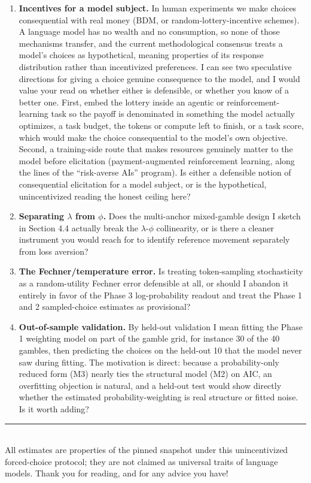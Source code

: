 \documentclass[11pt]{article}
\begin{document}
\begin{enumerate}[leftmargin=1.5em]
\item \textbf{Incentives for a model subject.} In human experiments we make choices consequential with real
money (BDM, or random-lottery-incentive schemes). A language model has no wealth and no
consumption, so none of those mechanisms transfer, and the current methodological consensus treats a model's
choices as hypothetical, meaning properties of its response distribution rather than incentivized preferences.
I can see two speculative directions for giving a choice genuine consequence to the model, and I would value
your read on whether either is defensible, or whether you know of a better one. First, embed the lottery
inside an agentic or reinforcement-learning task so the payoff is denominated in something the model actually
optimizes, a task budget, the tokens or compute left to finish, or a task score, which would make the choice
consequential to the model's own objective. Second, a training-side route that makes resources genuinely
matter to the model before elicitation (payment-augmented reinforcement learning, along the lines of the
``risk-averse AIs'' program). Is either a defensible notion of consequential elicitation for a model subject,
or is the hypothetical, unincentivized reading the honest ceiling here?
\item \textbf{Separating $\lambda$ from $\phi$.} Does the multi-anchor mixed-gamble design I sketch in
Section 4.4 actually break the $\lambda$-$\phi$ collinearity, or is there a cleaner instrument you would reach
for to identify reference movement separately from loss aversion?
\item \textbf{The Fechner/temperature error.} Is treating token-sampling stochasticity as a random-utility
Fechner error defensible at all, or should I abandon it entirely in favor of the Phase 3 log-probability
readout and treat the Phase 1 and 2 sampled-choice estimates as provisional?
\item \textbf{Out-of-sample validation.} By held-out validation I mean fitting the Phase 1 weighting model on
part of the gamble grid, for instance 30 of the 40 gambles, then predicting the choices on the held-out 10
that the model never saw during fitting. The motivation is direct: because a probability-only reduced form
(M3) nearly ties the structural model (M2) on AIC, an overfitting objection is natural, and a held-out test
would show directly whether the estimated probability-weighting is real structure or fitted noise. Is it
worth adding?
\end{enumerate}

\vspace{6pt}
{\color{rulegray}\rule{\linewidth}{0.8pt}}\\[3pt]
{\footnotesize\color{mutegray} All estimates are properties of the pinned snapshot under this unincentivized
forced-choice protocol; they are not claimed as universal traits of language models. Thank you for reading,
and for any advice you have!}
\end{document}
